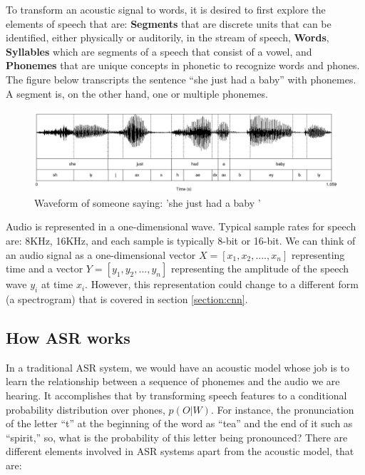 \documentclass[
  a4paper,
]{article}
\begin{document}
To transform an acoustic signal to words, it is desired to first explore
the elements of speech that are: \textbf{Segments} that are discrete
units that can be identified, either physically or auditorily, in the
stream of speech, \textbf{Words}, \textbf{Syllables} which are segments
of a speech that consist of a vowel, and \textbf{Phonemes} that are
unique concepts in phonetic to recognize words and phones. The figure
below transcripts the sentence ``she just had a baby'' with phonemes. A
segment is, on the other hand, one or multiple phonemes.

\begin{figure}

{\centering \includegraphics{phonems} 

}

\caption{Waveform of someone saying: 'she just had a baby '}\label{fig:phonemes}
\end{figure}

Audio is represented in a one-dimensional wave. Typical sample rates for
speech are: 8KHz, 16KHz, and each sample is typically 8-bit or 16-bit.
We can think of an audio signal as a one-dimensional vector
\(X = [x_1,x_2,....,x_n]\) representing time and a vector
\(Y = [y_1, y_2,...,y_n]\) representing the amplitude of the speech wave
\(y_i\) at time \(x_i\). However, this representation could change to a
different form (a spectrogram) that is covered in section
\ref{section:cnn}.

\hypertarget{how-asr-works}{%
\subsection{How ASR works}\label{how-asr-works}}

In a traditional ASR system, we would have an acoustic model whose job
is to learn the relationship between a sequence of phonemes and the
audio we are hearing. It accomplishes that by transforming speech
features to a conditional probability distribution over phones,
\(p(O|W)\). For instance, the pronunciation of the letter ``t'' at the
beginning of the word as ``tea'' and the end of it such as ``spirit,''
so, what is the probability of this letter being pronounced? There are
different elements involved in ASR systems apart from the acoustic
model, that are:
\end{document}
